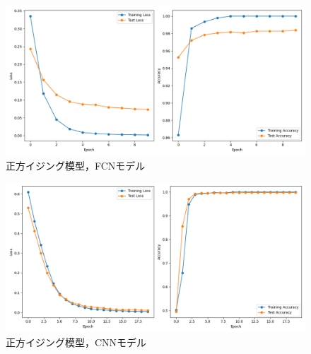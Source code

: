 \documentclass[a4paper,11pt]{jsreport}
\begin{document}
\begin{figure}[H]
  \begin{center}
    \includegraphics[width=\linewidth]{image/plot_square_FCNN_2.png}
    \caption{正方イジング模型，FCNモデル}
    \label{正方イジングFCNloss}
  \end{center}
\end{figure}
\begin{figure}[H]
  \begin{center}
    \includegraphics[width=\linewidth]{image/plot_square_CNN_2.png}
    \caption{正方イジング模型，CNNモデル}
    \label{正方イジングCNNloss}
  \end{center}
\end{figure}
\end{document}
